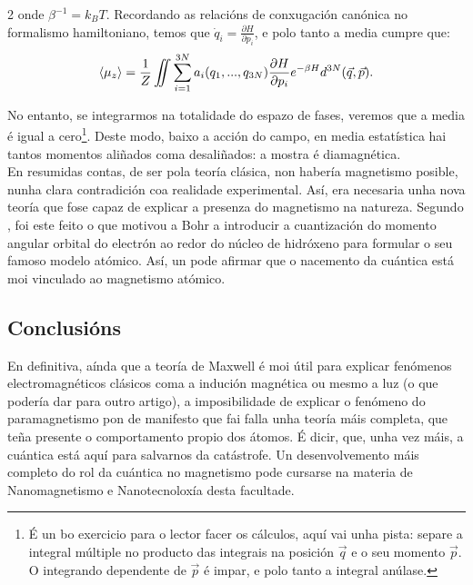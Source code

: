 \begin{multicols}{2}
onde $\beta^{-1} = k_B T$. Recordando as relacións de conxugación canónica no
formalismo hamiltoniano, temos que $\dot q_i = \frac{\partial H}{\partial
p_i}$, e polo tanto a media cumpre que:
\begin{equation}
    \braket{\mu_z} = \frac{1}{Z}\iint\sum_{i=1}^{3N} a_i
    (q_1,...,q_{3N}) \frac{\partial H}{\partial p_i}e^{-\beta
    H}d^{3N}(\vec q,\vec p).
\end{equation}

No entanto, se integrarmos na totalidade do espazo de fases, veremos que a
media é igual a cero\footnote{É un bo exercicio para o lector facer os
cálculos, aquí vai unha pista: separe a integral múltiple no producto das
integrais na posición $\vec q$ e o seu momento $\vec p$. O integrando
dependente de $\vec p$ é impar, e polo tanto a integral anúlase.}. Deste modo,
baixo a acción do campo, en media estatística hai tantos momentos aliñados
coma desaliñados: a mostra é diamagnética.\\

En resumidas contas, de ser pola teoría clásica, non habería magnetismo
posible, nunha clara contradición coa realidade experimental. Así, era
necesaria unha nova teoría que fose capaz de explicar a presenza do magnetismo
na natureza. Segundo \cite{van-vleck.jh_1977}, foi este feito o
que motivou a Bohr a introducir a cuantización do momento angular orbital do
electrón ao redor do núcleo de hidróxeno para formular o seu famoso modelo
atómico. Así, un pode afirmar que o nacemento da cuántica está moi vinculado ao
magnetismo atómico.

\subsection*{Conclusións}

En definitiva, aínda que a teoría de Maxwell é moi útil para explicar fenómenos
electromagnéticos clásicos coma a indución magnética ou mesmo a luz (o que
podería dar para outro artigo), a imposibilidade de explicar o fenómeno do
paramagnetismo pon de manifesto que fai falla unha teoría máis completa, que
teña presente o comportamento propio dos átomos. É dicir, que, unha vez máis, a
cuántica está aquí para salvarnos da catástrofe. Un desenvolvemento máis
completo do rol da cuántica no magnetismo pode cursarse na materia de
Nanomagnetismo e Nanotecnoloxía desta facultade.

\printbibliography

\end{multicols}
